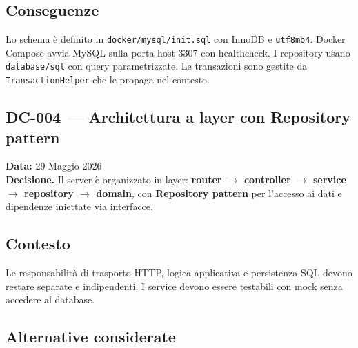 \documentclass[a4paper,12pt]{article}
\begin{document}
\subsection*{Conseguenze}
Lo schema \`{e} definito in \texttt{docker/mysql/init.sql} con InnoDB e \texttt{utf8mb4}. Docker Compose avvia MySQL sulla porta host 3307 con healthcheck. I repository usano \texttt{database/sql} con query parametrizzate. Le transazioni sono gestite da \texttt{TransactionHelper} che le propaga nel contesto.

\begin{decisionbox}
\section*{DC-004 --- Architettura a layer con Repository pattern}
\textbf{Data:} 29 Maggio 2026\\
\textbf{Decisione.} Il server \`{e} organizzato in layer: \textbf{router $\to$ controller $\to$ service $\to$ repository $\to$ domain}, con \textbf{Repository pattern} per l'accesso ai dati e dipendenze iniettate via interfacce.
\end{decisionbox}

\subsection*{Contesto}
Le responsabilit\`{a} di trasporto HTTP, logica applicativa e persistenza SQL devono restare separate e indipendenti. I service devono essere testabili con mock senza accedere al database.


\subsection*{Alternative considerate}
\end{document}

